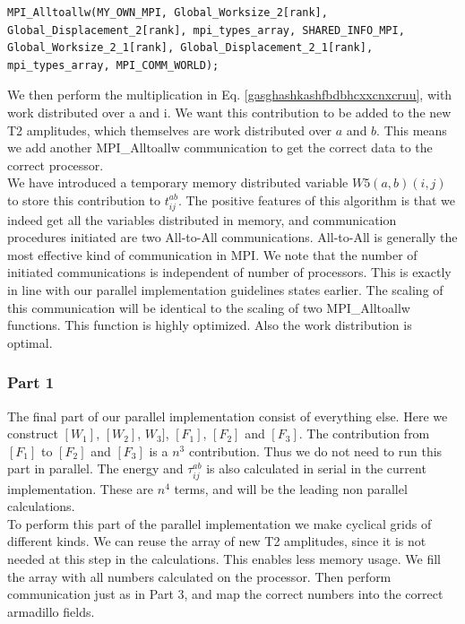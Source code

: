 \documentclass[a4paper,norsk,11pt,twoside]{report}
\begin{document}
\begin{lstlisting}
MPI_Alltoallw(MY_OWN_MPI, Global_Worksize_2[rank], Global_Displacement_2[rank], mpi_types_array, SHARED_INFO_MPI, Global_Worksize_2_1[rank], Global_Displacement_2_1[rank], mpi_types_array, MPI_COMM_WORLD);
\end{lstlisting}

We then perform the multiplication in Eq. \eqref{gasghashkashfbdbhcxxcnxcruu}, with work distributed over a and i. We want this contribution to be added to the new T2 amplitudes, which themselves are work distributed over $a$ and $b$. This means we add another MPI\_Alltoallw communication to get the correct data to the correct processor. \\

We have introduced a temporary memory distributed variable $W5(a,b)(i,j)$ to store this contribution to $t_{ij}^{ab}$. The positive features of this algorithm is that we indeed get all the variables distributed in memory, and communication procedures initiated are two All-to-All communications. All-to-All is generally the most effective kind of communication in MPI. We note that the number of initiated communications is independent of number of processors. This is exactly in line with our parallel implementation guidelines states earlier. The scaling of this communication will be identical to the scaling of two MPI\_Alltoallw functions. This function is highly optimized. Also the work distribution is optimal.

\subsubsection{Part 1 \label{problem_part_ccsd_parallel}}
The final part of our parallel implementation consist of everything else. Here we construct $[W_1]$, $[W_2]$, $W_3]$, $[F_1]$, $[F_2]$ and $[F_3]$. The contribution from $[F_1]$ to $[F_2]$ and $[F_3]$ is a $n^3$ contribution. Thus we do not need to run this part in parallel. The energy and $\tau_{ij}^{ab}$ is also calculated in serial in the current implementation. These are $n^4$ terms, and will be the leading non parallel calculations. \\

To perform this part of the parallel implementation we make cyclical grids of different kinds. We can reuse the array of new T2 amplitudes, since it is not needed at this step in the calculations. This enables less memory usage. We fill the array with all numbers calculated on the processor. Then perform communication just as in Part 3, and map the correct numbers into the correct armadillo fields. \\
\end{document}

